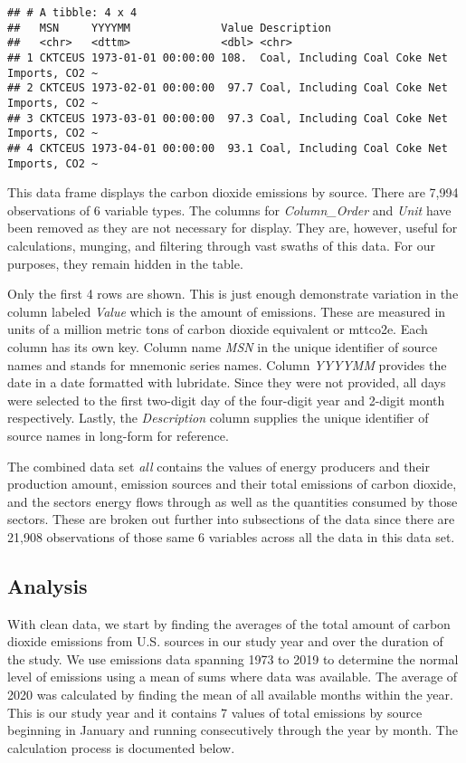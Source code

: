 \documentclass[
]{article}
\begin{document}
\begin{verbatim}
## # A tibble: 4 x 4
##   MSN     YYYYMM              Value Description                                 
##   <chr>   <dttm>              <dbl> <chr>                                       
## 1 CKTCEUS 1973-01-01 00:00:00 108.  Coal, Including Coal Coke Net Imports, CO2 ~
## 2 CKTCEUS 1973-02-01 00:00:00  97.7 Coal, Including Coal Coke Net Imports, CO2 ~
## 3 CKTCEUS 1973-03-01 00:00:00  97.3 Coal, Including Coal Coke Net Imports, CO2 ~
## 4 CKTCEUS 1973-04-01 00:00:00  93.1 Coal, Including Coal Coke Net Imports, CO2 ~
\end{verbatim}

This data frame displays the carbon dioxide emissions by source. There
are 7,994 observations of 6 variable types. The columns for
\emph{Column\_Order} and \emph{Unit} have been removed as they are not
necessary for display. They are, however, useful for calculations,
munging, and filtering through vast swaths of this data. For our
purposes, they remain hidden in the table.

Only the first 4 rows are shown. This is just enough demonstrate
variation in the column labeled \emph{Value} which is the amount of
emissions. These are measured in units of a million metric tons of
carbon dioxide equivalent or mttco2e. Each column has its own key.
Column name \emph{MSN} in the unique identifier of source names and
stands for mnemonic series names. Column \emph{YYYYMM} provides the date
in a date formatted with lubridate. Since they were not provided, all
days were selected to the first two-digit day of the four-digit year and
2-digit month respectively. Lastly, the \emph{Description} column
supplies the unique identifier of source names in long-form for
reference.

The combined data set \emph{all} contains the values of energy producers
and their production amount, emission sources and their total emissions
of carbon dioxide, and the sectors energy flows through as well as the
quantities consumed by those sectors. These are broken out further into
subsections of the data since there are 21,908 observations of those
same 6 variables across all the data in this data set.

\hypertarget{analysis}{%
\subsection{Analysis}\label{analysis}}

With clean data, we start by finding the averages of the total amount of
carbon dioxide emissions from U.S. sources in our study year and over
the duration of the study. We use emissions data spanning 1973 to 2019
to determine the normal level of emissions using a mean of sums where
data was available. The average of 2020 was calculated by finding the
mean of all available months within the year. This is our study year and
it contains 7 values of total emissions by source beginning in January
and running consecutively through the year by month. The calculation
process is documented below.
\end{document}
